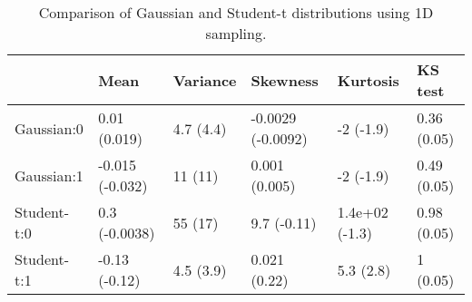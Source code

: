 \begin{table}
\centering
\caption{Comparison of Gaussian and Student-t distributions using 1D sampling.}
\label{tab:ch5_6_b}
\begin{tabular}{llllll}
\toprule
{} &             Mean &   Variance &           Skewness &        Kurtosis &      KS test \\
\midrule
Gaussian:0  &     0.01 (0.019) &  4.7 (4.4) &  -0.0029 (-0.0092) &       -2 (-1.9) &  0.36 (0.05) \\
Gaussian:1  &  -0.015 (-0.032) &    11 (11) &      0.001 (0.005) &       -2 (-1.9) &  0.49 (0.05) \\
Student-t:0 &    0.3 (-0.0038) &    55 (17) &        9.7 (-0.11) &  1.4e+02 (-1.3) &  0.98 (0.05) \\
Student-t:1 &    -0.13 (-0.12) &  4.5 (3.9) &       0.021 (0.22) &       5.3 (2.8) &     1 (0.05) \\
\bottomrule
\end{tabular}
\end{table}
